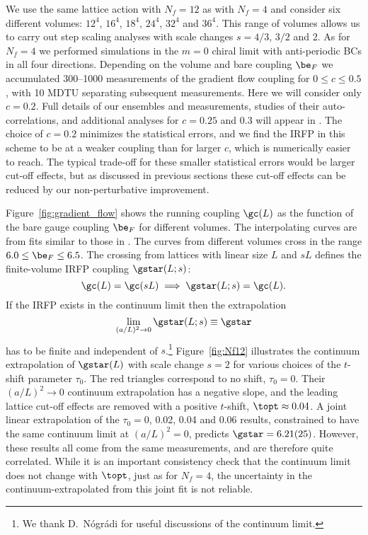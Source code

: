 We use the same lattice action with $N_f = 12$ as with $N_f = 4$ and consider six different volumes: $12^4$, $16^4$, $18^4$, $24^4$, $32^4$ and $36^4$.
This range of volumes allows us to carry out step scaling analyses with scale changes $s = 4 / 3$, $3 / 2$ and 2.
As for $N_f = 4$ we performed simulations in the $m = 0$ chiral limit with anti-periodic BCs in all four directions.
Depending on the volume and bare coupling $\be_F$ we accumulated 300--1000 measurements of the gradient flow coupling \gc for $0 \leq c \leq 0.5$, with 10 MDTU separating subsequent measurements.
Here we will consider only $c = 0.2$.
Full details of our ensembles and measurements, studies of their auto-correlations, and additional analyses for $c = 0.25$ and 0.3 will appear in .
The choice of $c = 0.2$ minimizes the statistical errors, and we find the IRFP in this scheme to be at a weaker coupling than for larger $c$, which is numerically easier to reach.
The typical trade-off for these smaller statistical errors would be larger cut-off effects, but as discussed in previous sections these cut-off effects can be reduced by our non-perturbative improvement.

Figure~\ref{fig:gradient_flow} shows the running coupling $\gc(L)$ as the function of the bare gauge coupling $\be_F$ for different volumes.
The interpolating curves are from fits similar to those in .
The curves from different volumes cross in the range $6.0 \leq \be_F \leq 6.5$.
The crossing from lattices with linear size $L$ and $sL$ defines the finite-volume IRFP coupling $\gstar(L; s)$:
\begin{equation}
  \gc(L) = \gc(sL) \implies \gstar(L; s) = \gc(L).
\end{equation}
If the IRFP exists in the continuum limit then the extrapolation
\begin{equation}
  \lim_{(a / L)^2 \to 0} \gstar(L; s) \equiv \gstar
\end{equation}
has to be finite and independent of $s$.\footnote{We thank D.~N\'ogr\'adi for useful discussions of the continuum limit.}
Figure~\ref{fig:Nf12} illustrates the continuum extrapolation of $\gstar(L)$ with scale change $s = 2$ for various choices of the $t$-shift parameter $\tau_0$.
The red triangles correspond to no shift, $\tau_0 = 0$.
Their $(a / L)^2 \to 0$ continuum extrapolation has a negative slope, and the leading lattice cut-off effects are removed with a positive $t$-shift, $\topt \approx 0.04$.
A joint linear extrapolation of the $\tau_0 = 0$, 0.02, 0.04 and 0.06 results, constrained to have the same continuum limit at $(a / L)^2 = 0$, predicts $\gstar = 6.21(25)$.
However, these results all come from the same measurements, and are therefore quite correlated.
While it is an important consistency check that the continuum limit does not change with $\topt$, just as for $N_f = 4$, the uncertainty in the continuum-extrapolated \gstar from this joint fit is not reliable.


